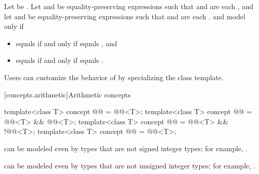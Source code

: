 \begin{itemdescr}
\pnum
Let  be .
Let  and  be
equality-preserving expressions such that
 and  are each , and
let  and  be equality-preserving expressions such that
 and  are each .
 and  model 
only if
\begin{itemize}
\item {} equals  if and only if
   equals , and
\item {} equals  if and only if
   equals .
\end{itemize}

\pnum
\begin{note}
Users can customize the behavior of  by specializing the
 class template.
\end{note}

\end{itemdescr}

[concepts.arithmetic]{Arithmetic concepts}

\begin{itemdecl}
template<class T>
  concept @@ = @@<T>;
template<class T>
  concept @@ = @@<T> && @@<T>;
template<class T>
  concept @@ = @@<T> && !@@<T>;
template<class T>
  concept @@ = @@<T>;
\end{itemdecl}

\begin{itemdescr}
\pnum
\begin{note}
 can be modeled even by types that are
not signed integer types; for example, .
\end{note}

\pnum
\begin{note}
 can be modeled even by types that are
not unsigned integer types; for example, .
\end{note}
\end{itemdescr}

